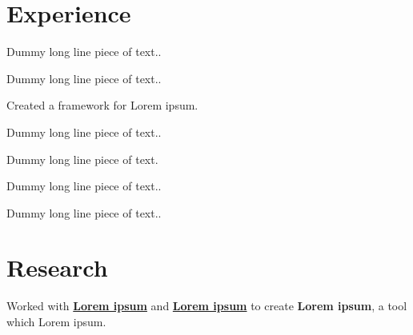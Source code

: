 \documentclass[]{Resume_Piyush}
\begin{document}
\begin{minipage}[t]{0.66\textwidth} 


\section{Experience}

\vspace{\topsep} %
\begin{tightemize}\item Dummy long line piece of text..
\end{tightemize}
\sectionsep

\begin{tightemize}
\item Dummy long line piece of text..\item Created a framework for Lorem ipsum.\item Dummy long line piece of text..\end{tightemize}
\sectionsep

\begin{tightemize}
\item Dummy long line piece of text.\item Dummy long line piece of text..\item Dummy long line piece of text..\end{tightemize}
\sectionsep


\section{Research}
Worked with \textbf{\href{http://www.cs.cornell.edu/~ashesh/}{Lorem ipsum}} and \textbf{\href{http://www.cs.cornell.edu/~asaxena/}{Lorem ipsum}} to create \textbf{Lorem ipsum}, a tool which  Lorem ipsum.
\sectionsep


\end{minipage}
\end{document}
